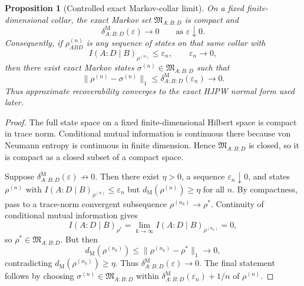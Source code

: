 \documentclass[11pt]{article}
\newtheorem{proposition}[theorem]{Proposition}
\begin{document}
\begin{proposition}[Controlled exact Markov-collar limit]\label{prop:controlledmarkov}
On a fixed finite-dimensional collar, the exact Markov set \(\mathfrak M_{A:B:D}\) is compact and
\[
\delta^{\mathrm M}_{A:B:D}(\varepsilon)\longrightarrow 0
\qquad
\text{as }\varepsilon\downarrow 0.
\]
Consequently, if \(\rho^{(n)}_{ABD}\) is any sequence of states on that same collar with
\[
I(A:D\mid B)_{\rho^{(n)}}\le \varepsilon_n,
\qquad
\varepsilon_n\to0,
\]
then there exist exact Markov states \(\sigma^{(n)}\in\mathfrak M_{A:B:D}\) such that
\[
\|\rho^{(n)}-\sigma^{(n)}\|_1
\le
\delta^{\mathrm M}_{A:B:D}(\varepsilon_n)
\longrightarrow 0.
\]
Thus approximate recoverability converges to the exact HJPW normal form used later.
\end{proposition}

\begin{proof}
The full state space on a fixed finite-dimensional Hilbert space is compact in trace norm. Conditional mutual information is continuous there because von Neumann entropy is continuous in finite dimension. Hence \(\mathfrak M_{A:B:D}\) is closed, so it is compact as a closed subset of a compact space.

Suppose \(\delta^{\mathrm M}_{A:B:D}(\varepsilon)\not\to 0\). Then there exist \(\eta>0\), a sequence \(\varepsilon_n\downarrow 0\), and states \(\rho^{(n)}\) with \(I(A:D\mid B)_{\rho^{(n)}}\le \varepsilon_n\) but \(d_{\mathrm M}(\rho^{(n)})\ge \eta\) for all \(n\). By compactness, pass to a trace-norm convergent subsequence \(\rho^{(n_k)}\to \rho^\ast\). Continuity of conditional mutual information gives
\[
I(A:D\mid B)_{\rho^\ast}
=
\lim_{k\to\infty} I(A:D\mid B)_{\rho^{(n_k)}}
=
0,
\]
so \(\rho^\ast\in \mathfrak M_{A:B:D}\). But then
\[
d_{\mathrm M}(\rho^{(n_k)})
\le
\|\rho^{(n_k)}-\rho^\ast\|_1
\longrightarrow 0,
\]
contradicting \(d_{\mathrm M}(\rho^{(n_k)})\ge \eta\). Thus \(\delta^{\mathrm M}_{A:B:D}(\varepsilon)\to 0\). The final statement follows by choosing \(\sigma^{(n)}\in\mathfrak M_{A:B:D}\) within \(\delta^{\mathrm M}_{A:B:D}(\varepsilon_n)+1/n\) of \(\rho^{(n)}\).
\end{proof}
\end{document}
